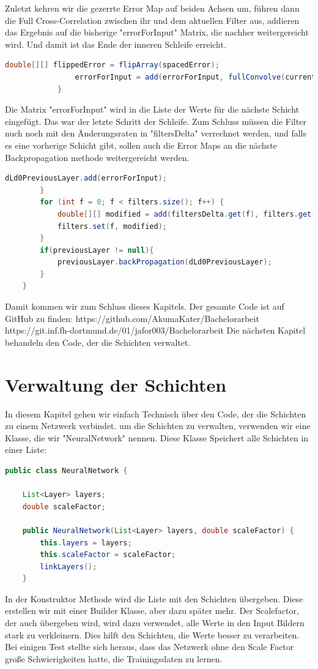 \documentclass[12pt]{article}
\begin{document}
Zuletzt kehren wir die gezerrte Error Map auf beiden Achsen um, führen dann die Full Cross-Correlation zwischen ihr und dem aktuellen Filter aus, addieren das Ergebnis auf die bisherige "errorForInput" Matrix, die nachher weitergereicht wird. Und damit ist das Ende der inneren Schleife erreicht.
\begin{lstlisting}[language=Java]
                double[][] flippedError = flipArray(spacedError);
                errorForInput = add(errorForInput, fullConvolve(currentFilter, flippedError));
            }
\end{lstlisting}
Die Matrix "errorForInput" wird in die Liste der Werte für die nächste Schicht eingefügt. Das war der letzte Schritt der Schleife. Zum Schluss müssen die Filter nuch noch mit den Änderungsraten in "filtersDelta" verrechnet werden, und falls es eine vorherige Schicht gibt, sollen auch die Error Maps an die nächste Backpropagation methode weitergereicht werden.
\begin{lstlisting}[language=Java]
            dLd0PreviousLayer.add(errorForInput);
        }
        for (int f = 0; f < filters.size(); f++) {
            double[][] modified = add(filtersDelta.get(f), filters.get(f));
            filters.set(f, modified);
        }
        if(previousLayer != null){
            previousLayer.backPropagation(dLd0PreviousLayer);
        }
    }
\end{lstlisting}

Damit kommen wir zum Schluss dieses Kapitels. Der gesamte Code ist auf GitHub zu finden:
https://github.com/AkumaKater/Bachelorarbeit
https://git.inf.fh-dortmund.de/01/jafor003/Bachelorarbeit
Die nächsten Kapitel behandeln den Code, der die Schichten verwaltet. 

\section{Verwaltung der Schichten}
In diesem Kapitel gehen wir einfach Technisch über den Code, der die Schichten zu einem Netzwerk verbindet.
um die Schichten zu verwalten, verwenden wir eine Klasse, die wir "NeuralNetwork" nennen. Diese Klasse Speichert alle Schichten in einer Liste:

\begin{lstlisting}[language=Java]
public class NeuralNetwork {

    List<Layer> layers;
    double scaleFactor;

    public NeuralNetwork(List<Layer> layers, double scaleFactor) {
        this.layers = layers;
        this.scaleFactor = scaleFactor;
        linkLayers();
    }
\end{lstlisting}
In der Konstruktor Methode wird die Liste mit den Schichten übergeben. Diese erstellen wir mit einer Builder Klasse, aber dazu später mehr. Der Scalefactor, der auch übergeben wird, wird dazu verwendet, alle Werte in den Input Bildern stark zu verkleinern. Dies hilft den Schichten, die Werte besser zu verarbeiten.
Bei einigen Test stellte sich heraus, dass das Netzwerk ohne den Scale Factor große Schwierigkeiten hatte, die Trainingsdaten zu lernen.
\end{document}
